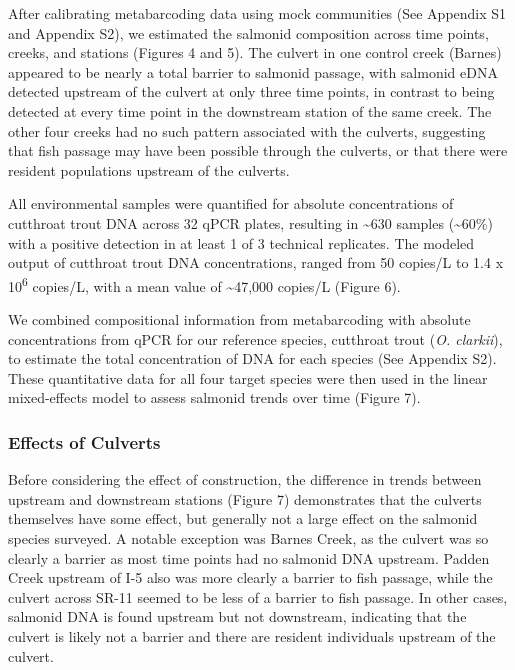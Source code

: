 \documentclass[
]{article}
\begin{document}
After calibrating metabarcoding data using mock communities (See
Appendix S1 and Appendix S2), we estimated the salmonid composition
across time points, creeks, and stations (Figures 4 and 5). The culvert
in one control creek (Barnes) appeared to be nearly a total barrier to
salmonid passage, with salmonid eDNA detected upstream of the culvert at
only three time points, in contrast to being detected at every time
point in the downstream station of the same creek. The other four creeks
had no such pattern associated with the culverts, suggesting that fish
passage may have been possible through the culverts, or that there were
resident populations upstream of the culverts.

All environmental samples were quantified for absolute concentrations of
cutthroat trout DNA across 32 qPCR plates, resulting in
\textasciitilde630 samples (\textasciitilde60\%) with a positive
detection in at least 1 of 3 technical replicates. The modeled output of
cutthroat trout DNA concentrations, ranged from 50 copies/L to 1.4 x
10\textsuperscript{6} copies/L, with a mean value of
\textasciitilde47,000 copies/L (Figure 6).

We combined compositional information from metabarcoding with absolute
concentrations from qPCR for our reference species, cutthroat trout
(\emph{O. clarkii}), to estimate the total concentration of DNA for each
species (See Appendix S2). These quantitative data for all four target
species were then used in the linear mixed-effects model to assess
salmonid trends over time (Figure 7).

\hypertarget{effects-of-culverts}{%
\subsubsection{Effects of Culverts}\label{effects-of-culverts}}

Before considering the effect of construction, the difference in trends
between upstream and downstream stations (Figure 7) demonstrates that
the culverts themselves have some effect, but generally not a large
effect on the salmonid species surveyed. A notable exception was Barnes
Creek, as the culvert was so clearly a barrier as most time points had
no salmonid DNA upstream. Padden Creek upstream of I-5 also was more
clearly a barrier to fish passage, while the culvert across SR-11 seemed
to be less of a barrier to fish passage. In other cases, salmonid DNA is
found upstream but not downstream, indicating that the culvert is likely
not a barrier and there are resident individuals upstream of the
culvert.
\end{document}
